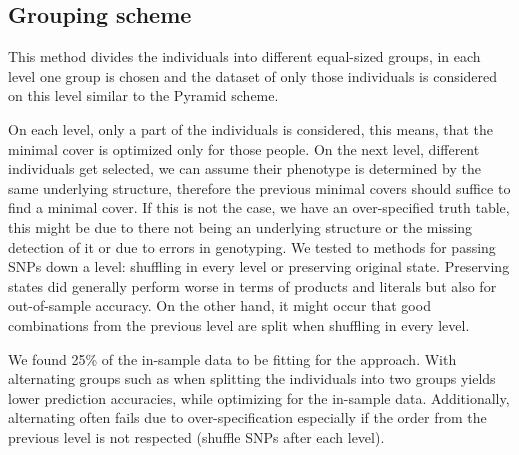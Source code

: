 \documentclass[letterpaper, 11pt]{article}
\begin{document}
\subsection{Grouping scheme}
\begin{figure} [!h] 
\end{figure}
This method divides the individuals into different equal-sized groups, in each level one group is chosen and the dataset of only those individuals is considered on this level similar to the Pyramid scheme. 

On each level, only a part of the individuals is considered, this means, that the minimal cover is optimized only for those people. On the next level, different individuals get selected, we can assume their phenotype is determined by the same underlying structure, therefore the previous minimal covers should suffice to find a minimal cover. If this is not the case, we have an over-specified truth table, this might be due to there not being an underlying structure or the missing detection of it or due to errors in genotyping. 
We tested to methods for passing SNPs down a level: shuffling in every level or preserving original state. Preserving states did generally perform worse in terms of products and literals but also for out-of-sample accuracy. On the other hand, it might occur that good combinations from the previous level are split when shuffling in every level.

We found 25\% of the in-sample data to be fitting for the approach. With alternating groups such as when splitting the individuals into two groups yields lower prediction accuracies, while optimizing for the in-sample data. Additionally, alternating often fails due to over-specification especially if the order from the previous level is not respected (shuffle SNPs after each level).
\end{document}
